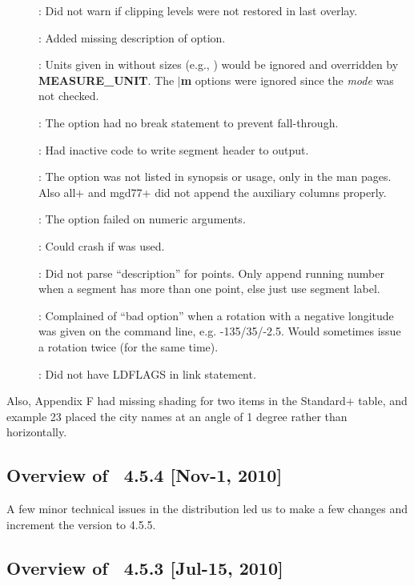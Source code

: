 \begin{description}
	\item []:	Did not warn if clipping levels were not restored in last overlay.
	\item []:	Added missing description of  option.
	\item []:	Units given in  without sizes (e.g., ) would be
		ignored and overridden by {\bf MEASURE\_UNIT}.  The $|${\bf m} options were ignored since the {\it mode} was not checked.
	\item []:	The  option had no break statement to prevent fall-through.
	\item []:	Had inactive code to write segment header to output.
	\item []:	The  option was not listed in synopsis or usage, only
		in the man pages.  Also all+ and mgd77+ did not append the auxiliary columns properly.
	\item []:	The  option failed on numeric arguments.
	\item []:	Could crash if  was used.
	\item []:	Did not parse ``description'' for points.
		Only append running number when a segment has more than one point, else just use segment label.
	\item []:	Complained of ``bad option'' when a rotation with a
		negative longitude was given on the command line, e.g. -135/35/-2.5.
		Would sometimes issue a rotation twice (for the same time).
	\item []:	Did not have LDFLAGS in link statement.
\end{description}
Also, Appendix F had missing shading for two items in the Standard+ table, and example 23 placed the city names at
an angle of 1 degree rather than horizontally.

\subsection{Overview of \gmt\ 4.5.4 [Nov-1, 2010]}

A few minor technical issues in the distribution led us to make a few changes and increment the version to 4.5.5.

\subsection{Overview of \gmt\ 4.5.3 [Jul-15, 2010]}

